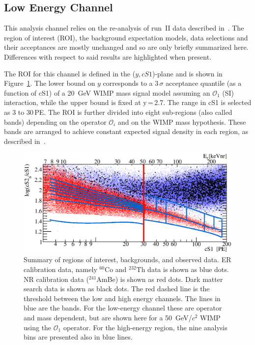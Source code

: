 
\subsection{Low Energy Channel}
\label{subsec:LowE}
This analysis channel relies on the re-analysis of run~II data described in~\cite{xe100_run_combination}. The region of interest (ROI), the background 
expectation models, data selections and their acceptances are mostly unchanged and so are only briefly summarized here. Differences with respect to said results are highlighted when present.

The ROI for this channel is defined in the ($y,cS1$)-plane and is shown in Figure~\ref{fig:phasespace}.  The lower 
bound on $y$ corresponds to a 3\,$\sigma$ acceptance quantile (as a function of cS1) of a 20~GeV WIMP mass signal model assuming an $\mathcal{O}_1$ (SI) interaction, while the upper bound is fixed at y\,=\,2.7.
The range in cS1 is selected as 3 to 30\,PE. 
The ROI is further divided into eight sub-regions (also called bands) depending on the operator $\mathcal{O}_i$ and on the WIMP mass hypothesis. 
These bands are arranged to achieve constant expected signal density in each region, as described in~\cite{xe100_run_combination}.

\begin{figure}[]
\begin{minipage}{1\linewidth}
\centerline{\includegraphics[width=1\linewidth]{Figures/eft_sr.eps}}
\end{minipage}
\caption{Summary of regions of interest, backgrounds, and observed data. ER calibration data, namely $^{60}\mathrm{Co}$ and $^{232}\mathrm{Th}$ data is shown as blue dots. NR calibration data ($^{241}$AmBe) is shown as red dots. Dark matter search data is shown as black dots. The red dashed line is the threshold between the low and high energy channels. The lines in blue are the bands. For the low-energy channel these are operator and mass dependent, but are shown here for a 50~GeV/$c^2$ WIMP using the $\mathcal{O}_1$ operator. For the high-energy region, the nine analysis bins are presented also in blue lines.
}
\label{fig:phasespace}
\end{figure}  


